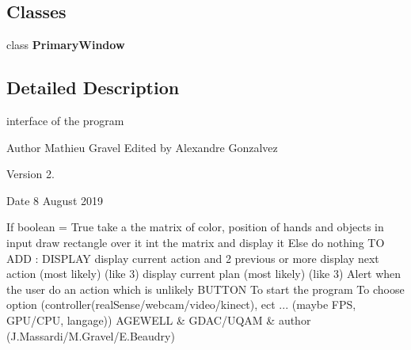 \subsection*{Classes}
\begin{DoxyCompactItemize}
\item 
class \textbf{ Primary\+Window}
\end{DoxyCompactItemize}


\subsection{Detailed Description}
interface of the program 

\begin{DoxyAuthor}{Author}
Mathieu Gravel Edited by Alexandre Gonzalvez 
\end{DoxyAuthor}
\begin{DoxyVersion}{Version}
2. 
\end{DoxyVersion}
\begin{DoxyDate}{Date}
8 August 2019
\end{DoxyDate}
If boolean = True take a the matrix of color, position of hands and objects in input draw rectangle over it int the matrix and display it Else do nothing TO A\+DD \+: D\+I\+S\+P\+L\+AY display current action and 2 previous or more display next action (most likely) (like 3) display current plan (most likely) (like 3) Alert when the user do an action which is unlikely B\+U\+T\+T\+ON To start the program To choose option (controller(real\+Sense/webcam/video/kinect), ect ... (maybe F\+PS, G\+P\+U/\+C\+PU, langage)) A\+G\+E\+W\+E\+LL \& G\+D\+A\+C/\+U\+Q\+AM \& author (J.\+Massardi/M.Gravel/\+E.\+Beaudry) 